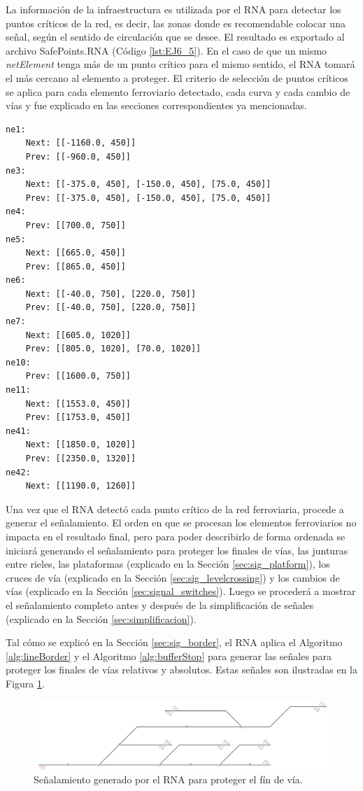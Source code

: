 	La información de la infraestructura es utilizada por el RNA para detectar los puntos críticos de la red, es decir, las zonas donde es recomendable colocar una señal, según el sentido de circulación que se desee. El resultado es exportado al archivo SafePoints.RNA (Código \ref{lst:EJ6_5}). En el caso de que un mismo \textit{netElement} tenga más de un punto crítico para el mismo sentido, el RNA tomará el más cercano al elemento a proteger. El criterio de selección de puntos críticos se aplica para cada elemento ferroviario detectado, cada curva y cada cambio de vías y fue explicado en las secciones correspondientes ya mencionadas.
	
	\begin{lstlisting}[language = {}, caption = SafePoints.RNA, label = {lst:EJ6_5}]
ne1:
	Next: [[-1160.0, 450]]
	Prev: [[-960.0, 450]]
ne3:
	Next: [[-375.0, 450], [-150.0, 450], [75.0, 450]]
	Prev: [[-375.0, 450], [-150.0, 450], [75.0, 450]]
ne4:
	Prev: [[700.0, 750]]
ne5:
	Next: [[665.0, 450]]
	Prev: [[865.0, 450]]
ne6:
	Next: [[-40.0, 750], [220.0, 750]]
	Prev: [[-40.0, 750], [220.0, 750]]
ne7:
	Next: [[605.0, 1020]]
	Prev: [[805.0, 1020], [70.0, 1020]]
ne10:
	Prev: [[1600.0, 750]]
ne11:
	Next: [[1553.0, 450]]
	Prev: [[1753.0, 450]]
ne41:
	Next: [[1850.0, 1020]]
	Prev: [[2350.0, 1320]]
ne42:
	Next: [[1190.0, 1260]]
	\end{lstlisting}	
	
	Una vez que el RNA detectó cada punto crítico de la red ferroviaria, procede a generar el señalamiento. El orden en que se procesan los elementos ferroviarios no impacta en el resultado final, pero para poder describirlo de forma ordenada se iniciará generando el señalamiento para proteger los finales de vías, las junturas entre rieles, las plataformas (explicado en la Sección \ref{sec:sig_platform}), los cruces de vía (explicado en la Sección \ref{sec:sig_levelcrossing}) y los cambios de vías (explicado en la Sección \ref{sec:signal_switches}). Luego se procederá a mostrar el señalamiento completo antes y después de la simplificación de señales (explicado en la Sección \ref{sec:simplificacion}). 
	
	Tal cómo se explicó en la Sección \ref{sec:sig_border}, el RNA aplica el Algoritmo \ref{alg:lineBorder} y el Algoritmo \ref{alg:bufferStop} para generar las señales para proteger los finales de vías relativos y absolutos. Estas señales son ilustradas en la Figura \ref{fig:EJ6_3}.
	
	\begin{figure}[H]
		\centering
		\includegraphics[width=1\textwidth]{resultados-obtenidos/ejemplo6/images/6_step1.png}
		\centering\caption{Señalamiento generado por el RNA para proteger el fín de vía.}
		\label{fig:EJ6_3}
	\end{figure}

